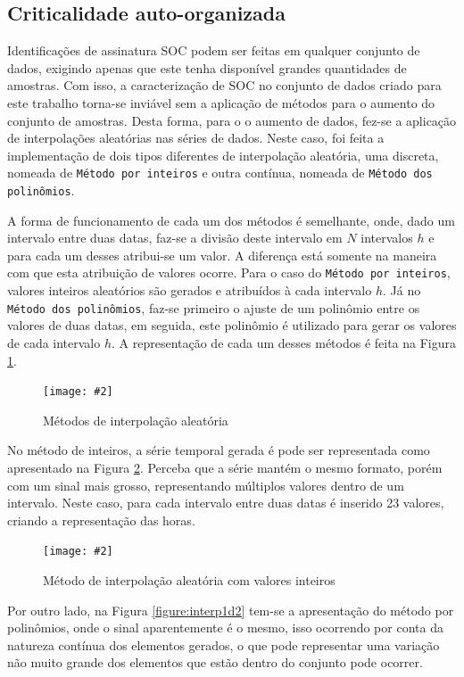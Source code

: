 \documentclass[a4paper,12pt]{article}
\newcommand{\image}[4]{
    \begin{figure}[H]%
        \begin{center}
        \caption{#3}
        \texttt{[image: \#2]}
        \label{#4}
        \end{center}
    \end{figure}
}
\begin{document}
\subsection{Criticalidade auto-organizada}

\par Identificações de assinatura SOC podem ser feitas em qualquer conjunto de dados, exigindo apenas que este tenha disponível grandes quantidades de amostras. Com isso, a caracterização de SOC no conjunto de dados criado para este trabalho torna-se inviável sem a aplicação de métodos para o aumento do conjunto de amostras. Desta forma, para o o aumento de dados, fez-se a aplicação de interpolações aleatórias nas séries de dados. Neste caso, foi feita a implementação de dois tipos diferentes de interpolação aleatória, uma discreta, nomeada de \texttt{Método por inteiros} e outra contínua, nomeada de \texttt{Método dos polinômios}. 

\par A forma de funcionamento de cada um dos métodos é semelhante, onde, dado um intervalo entre duas datas, faz-se a divisão deste intervalo em $N$ intervalos $h$ e para cada um desses atribui-se um valor. A diferença está somente na maneira com que esta atribuição de valores ocorre. Para o caso do \texttt{Método por inteiros}, valores inteiros aleatórios são gerados e atribuídos à cada intervalo $h$. Já no \texttt{Método dos polinômios}, faz-se primeiro o ajuste de um polinômio entre os valores de duas datas, em seguida, este polinômio é utilizado para gerar os valores de cada intervalo $h$. A representação de cada um desses métodos é feita na Figura \ref{figure:randominterpmethods}.

\image{1.05}{images/interpolacao/interp_geral.svg.png}{Métodos de interpolação aleatória}{figure:randominterpmethods}

\par No método de inteiros, a série temporal gerada é pode ser representada como apresentado na Figura \ref{figure:interp1d1}. Perceba que a série mantém o mesmo formato, porém com um sinal mais grosso, representando múltiplos valores dentro de um intervalo. Neste caso, para cada intervalo entre duas datas é inserido 23 valores, criando a representação das horas.

\image{0.80}{images/interpolacao/exemplos/interp_inteiros.png}{Método de interpolação aleatória com valores inteiros}{figure:interp1d1}

\par Por outro lado, na Figura \ref{figure:interp1d2} tem-se a apresentação do método por polinômios, onde o sinal aparentemente é o mesmo, isso ocorrendo por conta da natureza contínua dos elementos gerados, o que pode representar uma variação não muito grande dos elementos que estão dentro do conjunto pode ocorrer.
\end{document}
